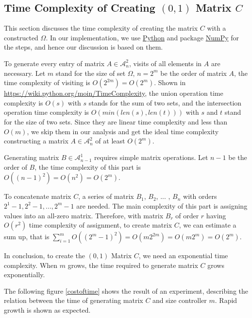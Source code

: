 \documentclass[11pt]{article}
\begin{document}
\subsection{Time Complexity of Creating $(0, 1)$ Matrix $C$}
This section discusses the time complexity of creating the matrix $C$ with a constructed $\Omega$. In our implementation, we use \href{https://www.python.org/}{Python} and package \href{https://numpy.org/}{NumPy} for the steps, and hence our discussion is based on them.

To generate every entry of matrix $A \in \mathcal{A}_n^2$, visits of all elements in $A$ are necessary. Let $m$ stand for the size of set $\Omega$, $n=2^m$ be the order of matrix $A$, the time complexity of visiting is $O(2^{2m}) = O(2^m)$. Shown in \url{https://wiki.python.org/moin/TimeComplexity}, the union operation time complexity is $O(s)$ with $s$ stands for the sum of two sets, and the intersection operation time complexity is $O(min(len(s), len(t)))$ with $s$ and $t$ stand for the size of two sets. Since they are linear time complexity and less than $O(m)$, we skip them in our analysis and get the ideal time complexity constructing a matrix $A \in \mathcal{A}_n^2$ of at least $O(2^m)$.

Generating matrix $B\in \mathcal{A}_{n - 1}^1$ requires simple matrix operations. Let $n - 1$ be the order of $B$, the time complexity of this part is $O((n-1)^2) = O(n^2) = O(2^m)$.

To concatenate matrix $C$, a series of matrix $B_1$, $B_2$, ... , $B_n$ with orders $2^1-1, 2^2-1, ..., 2^m-1$ are needed. The main complexity of this part is assigning values into an all-zero matrix. Therefore, with matrix $B_r$ of order $r$ having $O(r^2)$ time complexity of assignment, to create matrix $C$, we can estimate a sum up, that is $\sum_{i=1}^{m}O((2^m - 1)^2) = O(m2^{2m}) = O(m2^m) = O(2^m)$.

In conclusion, to create the $(0, 1)$ Matrix $C$, we need an exponential time complexity. When $m$ grows, the time required to generate matrix $C$ grows exponentially.

The following figure \ref{costoftime} shows the result of an experiment, describing the relation between the time of generating matrix $C$ and size controller $m$. Rapid growth is shown as expected.
\end{document}
